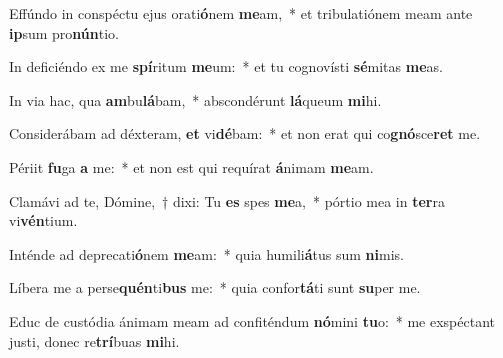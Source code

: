 \item Effúndo in conspéctu ejus orati\textbf{ó}nem \textbf{me}am,~* et tribulatiónem meam ante \textbf{ip}sum pro\textbf{nún}tio.
\item In deficiéndo ex me \textbf{spí}ritum \textbf{me}um:~* et tu cognovísti \textbf{sé}mitas \textbf{me}as.
\item In via hac, qua \textbf{am}bu\textbf{lá}bam,~* abscondérunt \textbf{lá}queum \textbf{mi}hi.
\item Considerábam ad déxteram, \textbf{et} vi\textbf{dé}bam:~* et non erat qui co\textbf{gnó}sce\textbf{ret} me.
\item Périit \textbf{fu}ga \textbf{a} me:~* et non est qui requírat \textbf{á}nimam \textbf{me}am.
\item Clamávi ad te, Dómine,~† dixi: Tu \textbf{es} spes \textbf{me}a,~* pórtio mea in \textbf{ter}ra vi\textbf{vén}tium.
\item Inténde ad deprecati\textbf{ó}nem \textbf{me}am:~* quia humili\textbf{á}tus sum \textbf{ni}mis.
\item Líbera me a perse\textbf{quén}ti\textbf{bus} me:~* quia confor\textbf{tá}ti sunt \textbf{su}per me.
\item Educ de custódia ánimam meam ad confiténdum \textbf{nó}mini \textbf{tu}o:~* me exspéctant justi, donec re\textbf{trí}buas \textbf{mi}hi.
